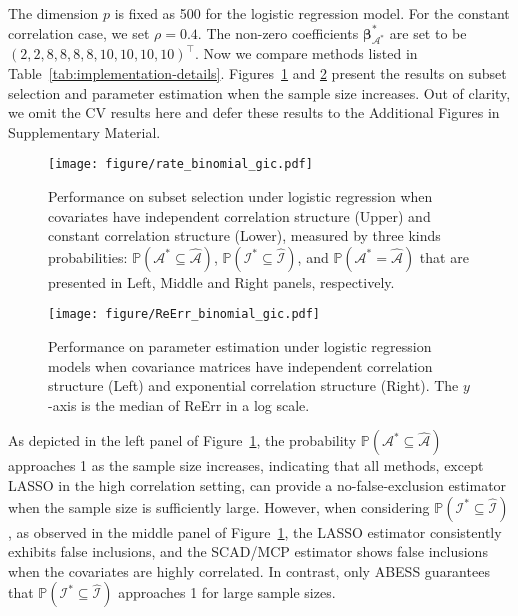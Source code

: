The dimension $p$ is fixed as 500 for the logistic regression model. For the constant correlation case, we set $\rho = 0.4$.
The non-zero coefficients $\boldsymbol{\beta}^*_{\mathcal{A}^*}$ are set to be $(2,2,8,8,8,8,10,10,10,10)^\top$. 
Now we compare methods listed in Table~\ref{tab:implementation-details}.
Figures~\ref{fig:rate_binomial} and \ref{fig:ReErr_binomial} present the results on subset selection and parameter estimation when the sample size increases. Out of clarity, we omit the CV results here and defer these results to the Additional Figures in Supplementary Material.


\begin{figure}[htbp]
\centering
\texttt{[image: figure/rate\_binomial\_gic.pdf]}
\informsMOR{
\vspace{-30pt}
}\fi
\caption{Performance on subset selection under logistic regression when covariates have independent correlation structure (Upper) and constant correlation structure (Lower), measured by three kinds probabilities: $\mathbb{P}(\mathcal{A}^* \subseteq \hat{\mathcal{A}})$, $\mathbb{P}(\mathcal{I}^* \subseteq \hat{\mathcal{I}})$, and $\mathbb{P}(\mathcal{A}^* = \hat{\mathcal{A}})$ that are presented in Left, Middle and Right panels, respectively.
}
\label{fig:rate_binomial}
\end{figure}
\begin{figure}[htbp]
\centering
\texttt{[image: figure/ReErr\_binomial\_gic.pdf]}
\informsMOR{
\vspace{-10pt}
}\fi
\caption{Performance on parameter estimation under logistic regression models when covariance matrices have independent correlation structure (Left) and exponential correlation structure (Right). The $y$-axis is the median of ReErr in a log scale.}
\label{fig:ReErr_binomial}
\end{figure}

As depicted in the left panel of Figure~\ref{fig:rate_binomial}, the probability $\mathbb{P}(\mathcal{A}^* \subseteq \hat{\mathcal{A}})$ approaches 1 as the sample size increases, indicating that all methods, except LASSO in the high correlation setting, can provide a no-false-exclusion estimator when the sample size is sufficiently large. However, when considering $\mathbb{P}(\mathcal{I}^* \subseteq \hat{\mathcal{I}})$, as observed in the middle panel of Figure~\ref{fig:rate_binomial}, the LASSO estimator consistently exhibits false inclusions, and the SCAD/MCP estimator shows false inclusions when the covariates are highly correlated. In contrast, only ABESS guarantees that $\mathbb{P}(\mathcal{I}^* \subseteq \hat{\mathcal{I}})$ approaches 1 for large sample sizes. 

